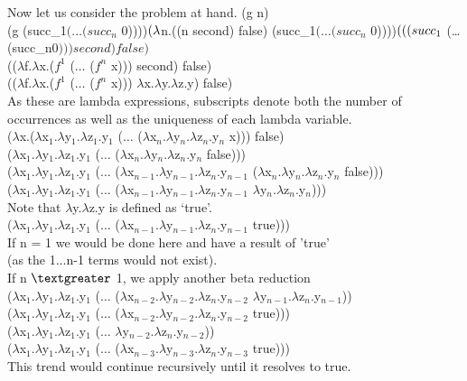 \documentclass{jhwhw}
\begin{document}
	\bigbreak
	Now let us consider the problem at hand.
	(g n) \\
	(g (succ_1$ (\ldots (succ_n$ 0))))$ \\
	(\lambda $n.((n second) false) (succ_1$ (\ldots (succ_n$ 0))))$ \\
	(((succ_1$ (\ldots (succ_n$ 0))) second) false)$ \\
	(($\lambda$f.$\lambda$x.($f^1$ ($\ldots$ ($f^n$ x))) second) false)\\
	(($\lambda$f.$\lambda$x.($f^1$ ($\ldots$ ($f^n$ x))) $\lambda$x.$\lambda$y.$\lambda$z.y) false)\\
	As these are lambda expressions, subscripts denote both the number of occurrences as well as 
	the uniqueness of each lambda variable. \\
	($\lambda$x.($\lambda$x$_1$.$\lambda$y$_1$.$\lambda$z$_1$.y$_1$ 
		($\ldots$ ($\lambda$x$_n$.$\lambda$y$_n$.$\lambda$z$_n$.y$_n$ x))) false) \\
	($\lambda$x$_1$.$\lambda$y$_1$.$\lambda$z$_1$.y$_1$ 
		($\ldots$ ($\lambda$x$_n$.$\lambda$y$_n$.$\lambda$z$_n$.y$_n$ false))) \\
	($\lambda$x$_1$.$\lambda$y$_1$.$\lambda$z$_1$.y$_1$ ($\ldots$ 
		($\lambda$x$_{n-1}$.$\lambda$y$_{n-1}$.$\lambda$z$_n$.y$_{n-1}$ 
		($\lambda$x$_n$.$\lambda$y$_n$.$\lambda$z$_n$.y$_n$ 
		false))) \\
	($\lambda$x$_1$.$\lambda$y$_1$.$\lambda$z$_1$.y$_1$ ($\ldots$ 
		($\lambda$x$_{n-1}$.$\lambda$y$_{n-1}$.$\lambda$z$_n$.y$_{n-1}$ 
		$\lambda$y$_n$.$\lambda$z$_n$.y$_n$))) \\
	Note that $\lambda$y.$\lambda$z.y is defined as `true'. \\
	($\lambda$x$_1$.$\lambda$y$_1$.$\lambda$z$_1$.y$_1$ ($\ldots$ 
		($\lambda$x$_{n-1}$.$\lambda$y$_{n-1}$.$\lambda$z$_n$.y$_{n-1}$ 
		true))) \\
	If n = 1 we would be done here and have a result of 'true' \\ (as the 1$\ldots$n-1 terms would not exist). \\
	If n $\textgreater$ 1, we apply another beta reduction \\
	($\lambda$x$_1$.$\lambda$y$_1$.$\lambda$z$_1$.y$_1$ ($\ldots$ 
		($\lambda$x$_{n-2}$.$\lambda$y$_{n-2}$.$\lambda$z$_n$.y$_{n-2}$ 
		$\lambda$y$_{n-1}$.$\lambda$z$_n$.y$_{n-1}$)) \\
	($\lambda$x$_1$.$\lambda$y$_1$.$\lambda$z$_1$.y$_1$ ($\ldots$ 
		($\lambda$x$_{n-2}$.$\lambda$y$_{n-2}$.$\lambda$z$_n$.y$_{n-2}$ 
		true))) \\
	($\lambda$x$_1$.$\lambda$y$_1$.$\lambda$z$_1$.y$_1$ ($\ldots$ 
		$\lambda$y$_{n-2}$.$\lambda$z$_n$.y$_{n-2}$)) \\
	($\lambda$x$_1$.$\lambda$y$_1$.$\lambda$z$_1$.y$_1$ ($\ldots$ 
		($\lambda$x$_{n-3}$.$\lambda$y$_{n-3}$.$\lambda$z$_n$.y$_{n-3}$ 
		true))) \\
	This trend would continue recursively until it resolves to true. \\
\end{document}
